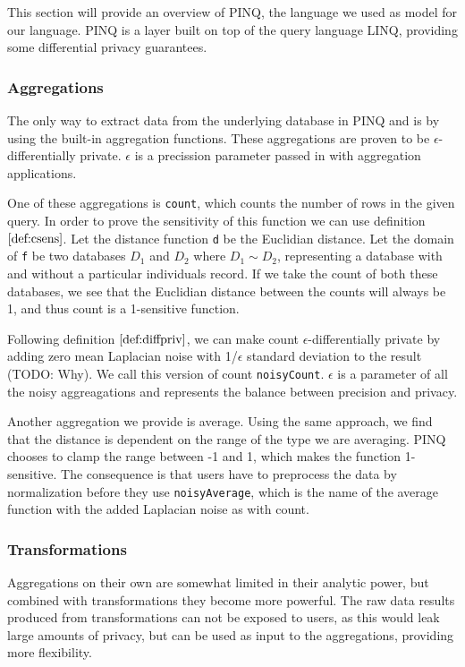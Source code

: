 \documentclass[12pt]{article}
\begin{document}
This section will provide an overview of PINQ, the language we used as model for our language. PINQ is a layer built on top of the query language LINQ, providing some differential privacy guarantees.

\subsubsection{Aggregations}\label{sec:pinq:aggregations}

The only way to extract data from the underlying database in PINQ and is by using the built-in aggregation functions. These aggregations are proven to be $\epsilon$-differentially private. $\epsilon$ is a precission parameter passed in with aggregation applications.

One of these aggregations is \texttt{count}, which counts the number of rows in the given query. In order to prove the sensitivity of this function we can use definition $\ref{def:csens}$. 
Let the distance function \texttt{d} be the Euclidian distance. Let the domain of \texttt{f} be two databases $D_1$ and $D_2$ where $D_1 \sim D_2$, representing a database with and without a particular individuals record. If we take the count of both these databases, we see that the Euclidian distance between the counts will always be 1, and thus count is a 1-sensitive function.

Following definition $\ref{def:diffpriv}$, we can make count $\epsilon$-differentially private by adding zero mean Laplacian noise with 1/$\epsilon$ standard deviation to the result (TODO: Why). We call this version of count \texttt{noisyCount}. $\epsilon$ is a parameter of all the noisy aggreagations and represents the balance between precision and privacy.

Another aggregation we provide is average. Using the same approach, we find that the distance is dependent on the range of the type we are averaging. PINQ chooses to clamp the range between -1 and 1, which makes the function 1-sensitive. The consequence is that users have to preprocess the data by normalization before they use \texttt{noisyAverage}, which is the name of the average function with the added Laplacian noise as with count.

\subsubsection{Transformations}\label{sec:pinq:transformations}

Aggregations on their own are somewhat limited in their analytic power, but combined with transformations they become more powerful.
The raw data results produced from transformations can not be exposed to users, as this would leak large amounts of privacy, but can be used as input to the aggregations, providing more flexibility.
\end{document}
